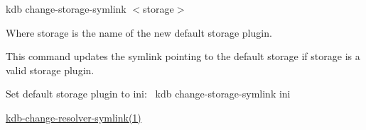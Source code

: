 {\ttfamily kdb change-\/storage-\/symlink $<$storage$>$}

Where {\ttfamily storage} is the name of the new default storage plugin.

This command updates the symlink pointing to the default storage if {\ttfamily storage} is a valid storage plugin.

Set default storage plugin to ini\+:~\newline
 {\ttfamily kdb change-\/storage-\/symlink ini}


\begin{DoxyItemize}
\item \mbox{\hyperlink{doc_help_kdb-change-resolver-symlink_md}{kdb-\/change-\/resolver-\/symlink(1)}} 
\end{DoxyItemize}
